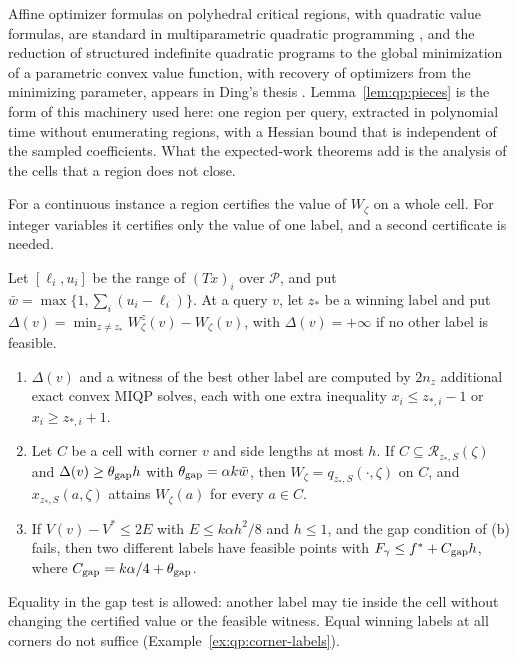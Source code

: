 Affine optimizer formulas on polyhedral critical regions, with quadratic
value formulas, are standard in multiparametric quadratic programming
\cite{bemporad2002-the-explicit-linear-quadratic-regulator,tndel2003-an-algorithm-for-multi-parametric,patrinos2011-convex-parametric-piecewise-quadratic-optimization},
and the reduction of structured indefinite quadratic programs to the global
minimization of a parametric convex value function, with recovery of
optimizers from the minimizing parameter, appears in Ding's thesis
\cite{ding1996-a-parametric-solution-for-local}. Lemma~\ref{lem:qp:pieces}
is the form of this machinery used here: one region per query, extracted in
polynomial time without enumerating regions, with a Hessian bound that is
independent of the sampled coefficients. What the expected-work theorems add
is the analysis of the cells that a region does not close.

For a continuous instance a region certifies the value of $W_\zeta$ on a
whole cell. For integer variables it certifies only the value of one label,
and a second certificate is needed.

\begin{lemma}\label{lem:qp:gap}
Let $[\ell_i,u_i]$ be the range of $(Tx)_i$ over $\mathcal P$, and put
$\bar w=\max\{1,\sum_i(u_i-\ell_i)\}$. At a query $v$, let $z_*$ be a winning
label and put $\Delta(v)=\min_{z\ne z_*}W^z_\zeta(v)-W_\zeta(v)$, with
$\Delta(v)=+\infty$ if no other label is feasible.
\begin{enumerate}[label=(\alph*)]
\item $\Delta(v)$ and a witness of the best other label are computed by $2n_z$
 additional exact convex MIQP solves, each with one extra inequality
 $x_i\le z_{*,i}-1$ or $x_i\ge z_{*,i}+1$.
\item Let $C$ be a cell with corner $v$ and side lengths at most $h$. If
 $C\subseteq\mathcal R_{z_*,S}(\zeta)$ and $\Delta(v)\ge\theta_{\rm gap}h$
 with $\theta_{\rm gap}=\alpha k\bar w$, then $W_\zeta=q_{z_*,S}(\cdot,\zeta)$
 on $C$, and $x_{z_*,S}(a,\zeta)$ attains $W_\zeta(a)$ for every $a\in C$.
\item If $V(v)-V^*\le2E$ with $E\le k\alpha h^2/8$ and $h\le1$, and the gap
 condition of (b) fails, then two different labels have feasible points with
 $F_\gamma\le f^*+C_{\rm gap}h$, where $C_{\rm gap}=k\alpha/4+\theta_{\rm gap}$.
\end{enumerate}
\end{lemma}

Equality in the gap test is allowed: another label may tie inside the cell
without changing the certified value or the feasible witness. Equal winning
labels at all corners do not suffice (Example~\ref{ex:qp:corner-labels}).

